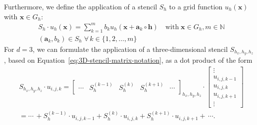 Furthermore, we define the application of a stencil $S_h$ to a grid function $u_h(\bm x)$ with $\bm x \in G_h$:
\begin{equation}
	\begin{split}
		& S_h \cdot u_h(\bm{x}) = \sum_{k=1}^m b_k u_h({\bm x + \bm{a}_k} \circ \bm{h}) \quad 
		\text{with} \; \bm{x} \in G_h, m \in \mathbb{N} \\ & (\bm{a}_k, b_k) \in S_h \; \forall \, k \in \{ 1, 2, \dots, m \}
	\end{split}
\label{eq:stencil-application}
\end{equation}
For $d = 3$, we can formulate the application of a three-dimensional stencil $S_{h_x, h_y, h_z}$, based on Equation~\eqref{eq:3D-stencil-matrix-notation}, as a dot product of the form
\begin{equation}
	\begin{split}
	& S_{h_x, h_y, h_z} \cdot u_{i,j,k} = 	
	\begin{bmatrix}
	\cdots & S_{h}^{(k-1)} & S_{h}^{(k)} & S_{h}^{(k+1)} & \cdots 
	\end{bmatrix}_{h_x, h_y, h_z} \cdot
	\begin{bmatrix}
	\vdots \\ u_{i,j,k-1} \\ u_{i,j,k} \\ u_{i,j,k+1} \\ \vdots 
	\end{bmatrix} \\
	& = \cdots \, + S_{h}^{(k-1)} \cdot u_{i,j,k-1} + S_{h}^{(k)} \cdot u_{i,j,k} + S_{h}^{(k+1)} \cdot u_{i,j,k+1} + \, \cdots .
	\end{split}
\end{equation}

